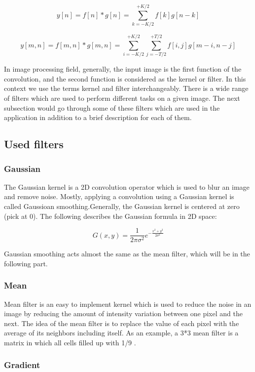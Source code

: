 \documentclass{article}
\begin{document}
			\[y[n] = f[n]*g[n] = \sum_{k=-K/2}^{+K/2} f[k]g[n-k]\]

			\[y[m,n] = f[m,n]*g[m,n] = \sum_{i=-K/2}^{+K/2}\sum_{j=-T/2}^{+T/2}f[i,j]g[m-i,n-j]\]



			
			
			In image processing field, generally, the input image is the first function of the convolution, and the second 
			function is considered as the kernel or filter.
			In this context we use the terms kernel and filter interchangeably.
			There is a wide range of filters which are used to perform different tasks on a given image. The next subsection would go through some of these 
			filters which are used in the application in addition to a brief description for each of them.

		\subsection{Used filters}
		
		\subsubsection{Gaussian}

			The Gaussian kernel is a 2D convolution operator which is used to blur an image and remove noise. Mostly, applying a convolution using a Gaussian
			kernel is called Gaussioan smoothing.Generally, the Gaussian kernel is centered at
			zero (pick at 0). The following describes the Gaussian formula in 2D space:

			\[G(x,y) = \frac{1}{2\pi\sigma^{2}}e^{-\frac{x^{2}+y^{2}}{2\sigma^{2}}}\]

			
			Gaussian smoothing acts almost the same as the mean filter, which will be in the following part.
		\subsubsection{Mean}
			Mean filter is an easy to implement kernel which is used to reduce the noise in an image by reducing the amount of intensity variation between one
			pixel and the next. The idea of the mean filter is to replace the value of each pixel with the average of its neighbors including itself. As an example,
			a 3*3 mean filter is a matrix in which all cells filled up with 1/9 .	
		
		\subsubsection{Gradient}
\end{document}
